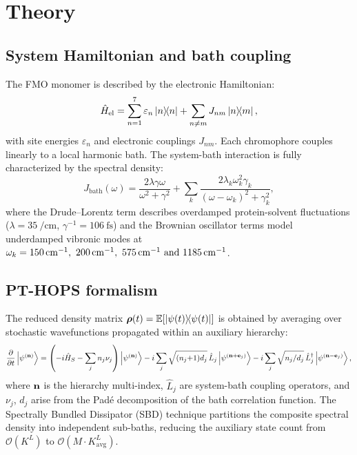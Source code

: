 \documentclass[aip,jcp,preprint]{revtex4-2}
\begin{document}
\section{\label{sec:theory}Theory}

\subsection{System Hamiltonian and bath coupling}
The FMO monomer is described by the electronic Hamiltonian:\cite{Adolphs2006}
\begin{equation}
\hat{H}_{\mathrm{el}} = \sum_{n=1}^{7} \varepsilon_n \dyad{n} + \sum_{n \neq m} J_{nm} \dyad{n}{m},
\end{equation}
with site energies $\varepsilon_n$ and electronic couplings $J_{nm}$. Each chromophore couples linearly to a local harmonic bath. The system-bath interaction is fully characterized by the spectral density:\cite{Moix2011}
\begin{equation}
J_{\mathrm{bath}}(\omega) = \frac{2\lambda\gamma\omega}{\omega^2 + \gamma^2} + \sum_k \frac{2\lambda_k\omega_k^2\gamma_k}{(\omega-\omega_k)^2 + \gamma_k^2},
\label{eq:spectral_density}
\end{equation}
where the Drude--Lorentz term describes overdamped protein-solvent fluctuations ($\lambda = \SI{35}{\per\centi\meter}$, $\gamma^{-1} = \SI{106}{\femto\second}$) and the Brownian oscillator terms model underdamped vibronic modes at $\omega_k = \SIlist{150;200;575;1185}{\per\centi\meter}$.\cite{Chin2013}

\subsection{PT-HOPS formalism}
The reduced density matrix $\vb*{\rho}(t) = \mathbb{E}[\dyad{\psi(t)}]$ is obtained by averaging over stochastic wavefunctions propagated within an auxiliary hierarchy:\cite{Suess2014,Citty2024a}
\begin{equation}
\pdv{t}\ket{\psi^{(\vb{n})}} = \left(-i\hat{H}_S - \sum_{j} n_j \nu_j\right)\ket{\psi^{(\vb{n})}}
- i\sum_{j} \sqrt{(n_j{+}1)d_j}\,\hat{L}_j \ket{\psi^{(\vb{n}+\vb{e}_j)}}
- i\sum_{j} \sqrt{n_j/d_j}\,\hat{L}_j^\dagger \ket{\psi^{(\vb{n}-\vb{e}_j)}},
\label{eq:hops}
\end{equation}
where $\vb{n}$ is the hierarchy multi-index, $\hat{L}_j$ are system-bath coupling operators, and $\nu_j$, $d_j$ arise from the Padé decomposition of the bath correlation function.\cite{Duan2017} The Spectrally Bundled Dissipator (SBD) technique partitions the composite spectral density into independent sub-baths, reducing the auxiliary state count from $\mathcal{O}(K^L)$ to $\mathcal{O}(M \cdot K_{\mathrm{avg}}^L)$.\cite{Citty2024a}
\end{document}
